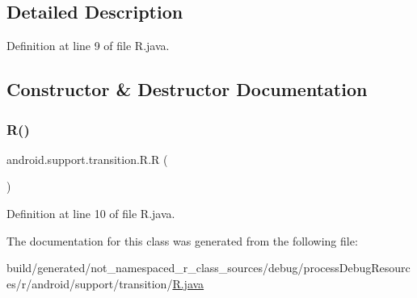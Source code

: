 \subsection{Detailed Description}


Definition at line 9 of file R.\+java.



\subsection{Constructor \& Destructor Documentation}
\mbox{\label{classandroid_1_1support_1_1transition_1_1_r_a49cf49904e6f9e2952a6503f2f307b08}} 
\subsubsection{\texorpdfstring{R()}{R()}}
{\footnotesize\ttfamily android.\+support.\+transition.\+R.\+R (\begin{DoxyParamCaption}{ }\end{DoxyParamCaption})\hspace{0.3cm}{\ttfamily [private]}}



Definition at line 10 of file R.\+java.


\begin{DoxyCode}{0}

\end{DoxyCode}


The documentation for this class was generated from the following file\+:\begin{DoxyCompactItemize}
\item 
build/generated/not\+\_\+namespaced\+\_\+r\+\_\+class\+\_\+sources/debug/process\+Debug\+Resources/r/android/support/transition/\mbox{\hyperlink{android_2support_2transition_2_r_8java}{R.\+java}}\end{DoxyCompactItemize}
